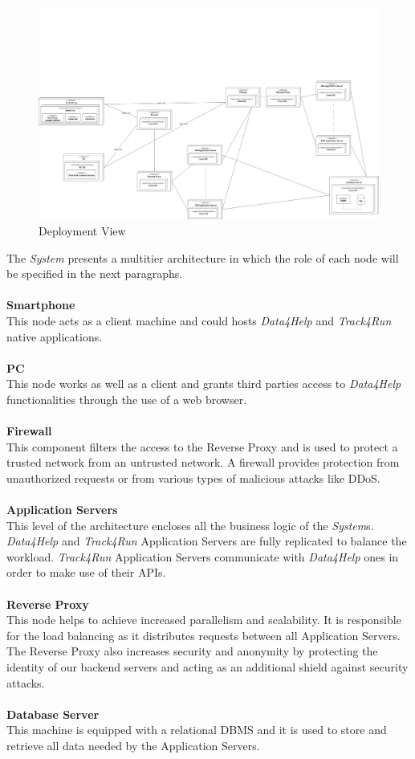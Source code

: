 \documentclass[titlepage]{article}
\begin{document}
	\begin{figure}[H]
		\center
		\includegraphics[width=15cm]{Deployment.png}
		\caption{Deployment View}
		\label{fig:DEPVIEW}
	\end{figure}
	\noindent
	The {\it System} presents a multitier architecture in which the role of each node will be specified in the next paragraphs. \\ \\
	{\bf Smartphone }\\ 
	This node acts as a client machine and could hosts {\it Data4Help} and {\it Track4Run} native applications. \\ \\
	{\bf PC }\\ 
	This node works as well as a client and grants third parties access to {\it Data4Help} functionalities through the use of a web browser.\\ \\
	{\bf Firewall }\\ 
	This component filters the access to the Reverse Proxy and is used to protect a trusted network from an untrusted network. A firewall provides protection from unauthorized requests or from various types of malicious attacks like DDoS.\\ \\
	{\bf Application Servers }\\ 
	This level of the architecture encloses all the business logic of the {\it System}s. {\it Data4Help} and {\it Track4Run} Application Servers are fully replicated to balance the workload. {\it Track4Run} Application Servers communicate with {\it Data4Help} ones in order to make use of their APIs.\\ \\
	{\bf Reverse Proxy }\\ 
	This node helps to achieve increased parallelism and scalability. It is responsible for the load balancing as it distributes requests between all Application Servers. The Reverse Proxy also increases security and anonymity by protecting the identity of our backend servers and acting as an additional shield against security attacks.\\ \\
	{\bf Database Server }\\ 
	This machine is equipped with a relational DBMS and it is used to store and retrieve all data needed by the Application Servers. 
	
\end{document}
